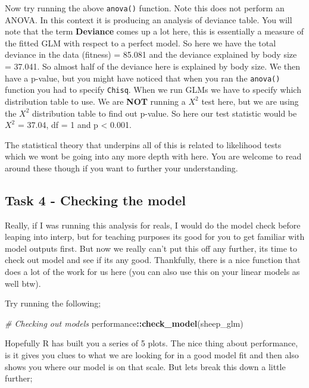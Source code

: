 \documentclass[
]{book}
\newenvironment{Shaded}{\begin{snugshade}}{\end{snugshade}}
\newcommand{\CommentTok}[1]{\textcolor[rgb]{0.56,0.35,0.01}{\textit{#1}}}
\newcommand{\FunctionTok}[1]{\textcolor[rgb]{0.13,0.29,0.53}{\textbf{#1}}}
\newcommand{\NormalTok}[1]{#1}
\newcommand{\SpecialCharTok}[1]{\textcolor[rgb]{0.81,0.36,0.00}{\textbf{#1}}}
\begin{document}
Now try running the above \texttt{anova()} function. Note this does not perform an ANOVA. In this context it is producing an analysis of deviance table. You will note that the term \textbf{Deviance} comes up a lot here, this is essentially a measure of the fitted GLM with respect to a perfect model. So here we have the total deviance in the data (fitness) = 85.081 and the deviance explained by body size = 37.041. So almost half of the deviance here is explained by body size. We then have a p-value, but you might have noticed that when you ran the \texttt{anova()} function you had to specify \texttt{Chisq}. When we run GLMs we have to specify which distribution table to use. We are \textbf{NOT} running a \(X^2\) test here, but we are using the \(X^2\) distribution table to find out p-value. So here our test statistic would be \(X^2\) = 37.04, df = 1 and p \textless{} 0.001.

The statistical theory that underpins all of this is related to likelihood tests which we wont be going into any more depth with here. You are welcome to read around these though if you want to further your understanding.

\subsection{Task 4 - Checking the model}\label{task-4---checking-the-model}

Really, if I was running this analysis for reals, I would do the model check before leaping into interp, but for teaching purposes its good for you to get familiar with model outputs first. But now we really can't put this off any further, its time to check out model and see if its any good. Thankfully, there is a nice function that does a lot of the work for us here (you can also use this on your linear models as well btw).

Try running the following;

\begin{Shaded}
\begin{Highlighting}[]
\CommentTok{\# Checking out models}
\NormalTok{performance}\SpecialCharTok{::}\FunctionTok{check\_model}\NormalTok{(sheep\_glm)}
\end{Highlighting}
\end{Shaded}

Hopefully R has built you a series of 5 plots. The nice thing about performance, is it gives you clues to what we are looking for in a good model fit and then also shows you where our model is on that scale. But lets break this down a little further;
\end{document}
